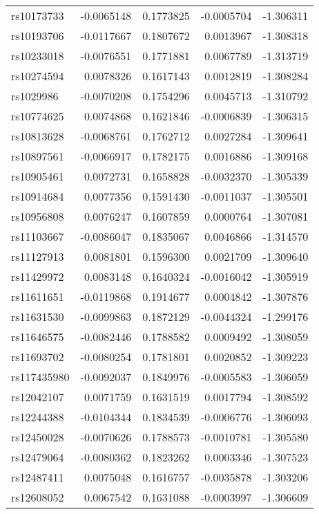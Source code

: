 \documentclass[
]{article}
\theoremstyle{plain}
\begin{document}
\begin{longtable}[t]{lrrrr}
\endfoot
\bottomrule
\endlastfoot
rs10173733 & -0.0065148 & 0.1773825 & -0.0005704 & -1.306311\\
rs10193706 & -0.0117667 & 0.1807672 & 0.0013967 & -1.308318\\
rs10233018 & -0.0076551 & 0.1771881 & 0.0067789 & -1.313719\\
rs10274594 & 0.0078326 & 0.1617143 & 0.0012819 & -1.308284\\
rs1029986 & -0.0070208 & 0.1754296 & 0.0045713 & -1.310792\\
\addlinespace
rs10774625 & 0.0074868 & 0.1621846 & -0.0006839 & -1.306315\\
rs10813628 & -0.0068761 & 0.1762712 & 0.0027284 & -1.309641\\
rs10897561 & -0.0066917 & 0.1782175 & 0.0016886 & -1.309168\\
rs10905461 & 0.0072731 & 0.1658828 & -0.0032370 & -1.305339\\
rs10914684 & 0.0077356 & 0.1591430 & -0.0011037 & -1.305501\\
\addlinespace
rs10956808 & 0.0076247 & 0.1607859 & 0.0000764 & -1.307081\\
rs11103667 & -0.0086047 & 0.1835067 & 0.0046866 & -1.314570\\
rs11127913 & 0.0081801 & 0.1596300 & 0.0021709 & -1.309640\\
rs11429972 & 0.0083148 & 0.1640324 & -0.0016042 & -1.305919\\
rs11611651 & -0.0119868 & 0.1914677 & 0.0004842 & -1.307876\\
\addlinespace
rs11631530 & -0.0099863 & 0.1872129 & -0.0044324 & -1.299176\\
rs11646575 & -0.0082446 & 0.1788582 & 0.0009492 & -1.308059\\
rs11693702 & -0.0080254 & 0.1781801 & 0.0020852 & -1.309223\\
rs117435980 & -0.0092037 & 0.1849976 & -0.0005583 & -1.306059\\
rs12042107 & 0.0071759 & 0.1631519 & 0.0017794 & -1.308592\\
\addlinespace
rs12244388 & -0.0104344 & 0.1834539 & -0.0006776 & -1.306093\\
rs12450028 & -0.0070626 & 0.1788573 & -0.0010781 & -1.305580\\
rs12479064 & -0.0080362 & 0.1823262 & 0.0003346 & -1.307523\\
rs12487411 & 0.0075048 & 0.1616757 & -0.0035878 & -1.303206\\
rs12608052 & 0.0067542 & 0.1631088 & -0.0003997 & -1.306609\\

\end{longtable}
\end{document}
